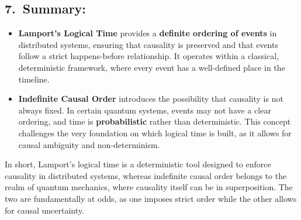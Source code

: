 \subsection*{7.\ Summary:}

\begin{itemize}[leftmargin=1.5em]
\item \textbf{Lamport’s Logical Time} provides a \textbf{definite ordering of events} in distributed systems, ensuring that causality is preserved and that events follow a strict happens-before relationship. It operates within a classical, deterministic framework, where every event has a well-defined place in the timeline.
\item \textbf{Indefinite Causal Order} introduces the possibility that causality is not always fixed. In certain quantum systems, events may not have a clear ordering, and time is \textbf{probabilistic} rather than deterministic. This concept challenges the very foundation on which logical time is built, as it allows for causal ambiguity and non-determinism.
\end{itemize}

In short, Lamport's logical time is a deterministic tool designed to enforce causality in distributed systems, whereas indefinite causal order belongs to the realm of quantum mechanics, where causality itself can be in superposition. The two are fundamentally at odds, as one imposes strict order while the other allows for causal uncertainty.